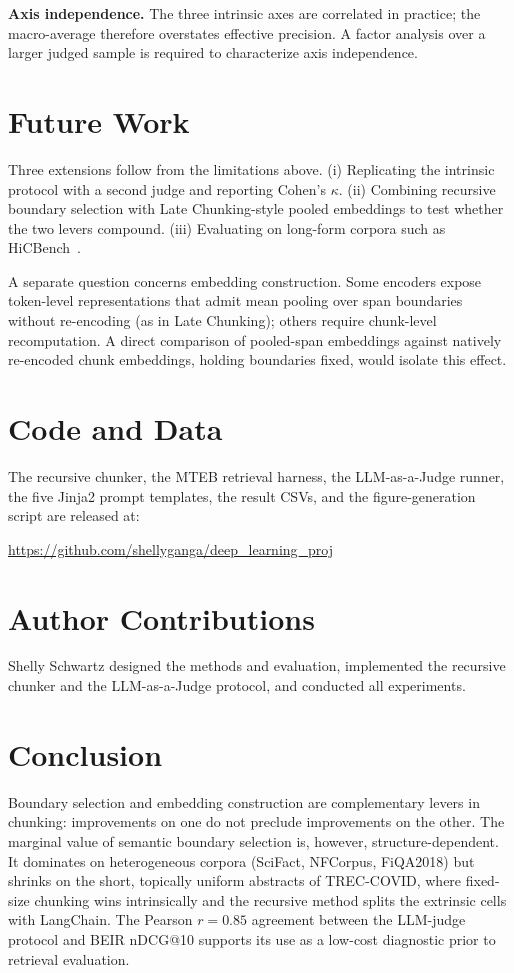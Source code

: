 \textbf{Axis independence.} The three intrinsic axes are correlated in practice; the macro-average therefore overstates effective precision. A factor analysis over a larger judged sample is required to characterize axis independence.

\section{Future Work}
Three extensions follow from the limitations above. (i) Replicating the intrinsic protocol with a second judge and reporting Cohen's $\kappa$. (ii) Combining recursive boundary selection with Late Chunking-style pooled embeddings to test whether the two levers compound. (iii) Evaluating on long-form corpora such as HiCBench~\cite{lu2025hichunk}.

A separate question concerns embedding construction. Some encoders expose token-level representations that admit mean pooling over span boundaries without re-encoding (as in Late Chunking); others require chunk-level recomputation. A direct comparison of pooled-span embeddings against natively re-encoded chunk embeddings, holding boundaries fixed, would isolate this effect.



\section{Code and Data}
The recursive chunker, the MTEB retrieval harness, the LLM-as-a-Judge runner, the five Jinja2 prompt templates, the result CSVs, and the figure-generation script are released at:

\begin{sloppypar}
\url{https://github.com/shellyganga/deep_learning_proj}
\end{sloppypar}

\section{Author Contributions}
Shelly Schwartz designed the methods and evaluation, implemented the recursive chunker and the LLM-as-a-Judge protocol, and conducted all experiments.

\section{Conclusion}
Boundary selection and embedding construction are complementary levers in chunking: improvements on one do not preclude improvements on the other. The marginal value of semantic boundary selection is, however, structure-dependent. It dominates on heterogeneous corpora (SciFact, NFCorpus, FiQA2018) but shrinks on the short, topically uniform abstracts of TREC-COVID, where fixed-size chunking wins intrinsically and the recursive method splits the extrinsic cells with LangChain. The Pearson $r=0.85$ agreement between the LLM-judge protocol and BEIR nDCG@10 supports its use as a low-cost diagnostic prior to retrieval evaluation.

